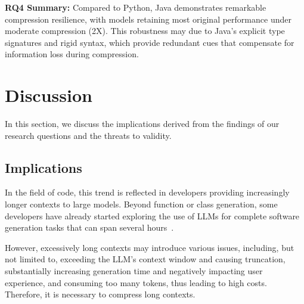\begin{center}
    \begin{myboxc} \textbf{RQ4 Summary: } %
    Compared to Python, Java demonstrates remarkable compression resilience, with models retaining most original performance under moderate compression (2X). This robustness may due to Java's explicit type signatures and rigid syntax, which provide redundant cues that compensate for information loss during compression.
    
    \end{myboxc} %
\end{center}

\section{Discussion}
\vspace{-2pt}
In this section, we discuss the implications derived from the findings of our research questions and the threats to validity.

\subsection{Implications}
In the field of code, this trend is reflected in developers providing increasingly longer contexts to large models. Beyond function or class generation, some developers have already started exploring the use of LLMs for complete software generation tasks that can span several hours~\cite{manus,metagpt}.

However, excessively long contexts may introduce various issues, including, but not limited to, exceeding the LLM’s context window and causing truncation, substantially increasing generation time and negatively impacting user experience, and consuming too many tokens, thus leading to high costs. Therefore, it is necessary to compress long contexts.

